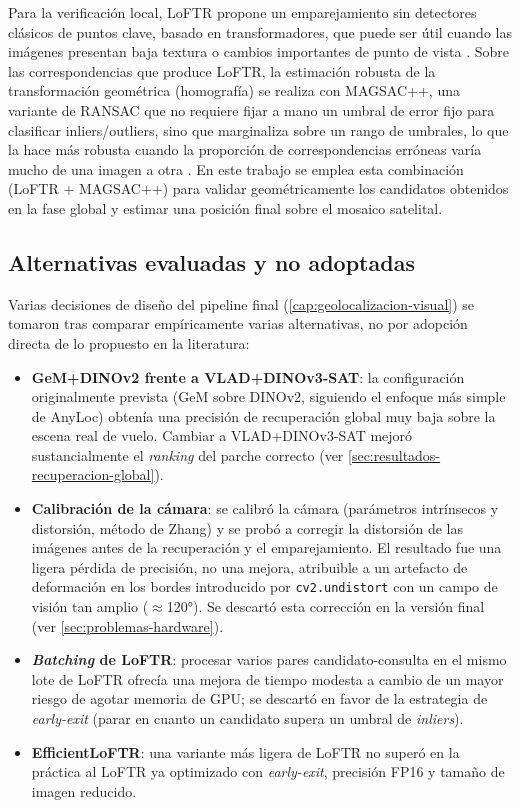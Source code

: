 Para la verificación local, LoFTR propone un emparejamiento sin detectores clásicos de puntos clave, basado en transformadores, que puede ser útil cuando las imágenes presentan baja textura o cambios importantes de punto de vista \parencite{sun2021loftr}. Sobre las correspondencias que produce LoFTR, la estimación robusta de la transformación geométrica (homografía) se realiza con MAGSAC++, una variante de RANSAC que no requiere fijar a mano un umbral de error fijo para clasificar inliers/outliers, sino que marginaliza sobre un rango de umbrales, lo que la hace más robusta cuando la proporción de correspondencias erróneas varía mucho de una imagen a otra \parencite{barath2020magsac++}. En este trabajo se emplea esta combinación (LoFTR + MAGSAC++) para validar geométricamente los candidatos obtenidos en la fase global y estimar una posición final sobre el mosaico satelital.

\subsection{Alternativas evaluadas y no adoptadas}
\label{sec:estado-alternativas-no-adoptadas}

Varias decisiones de diseño del pipeline final (\autoref{cap:geolocalizacion-visual}) se tomaron tras comparar empíricamente varias alternativas, no por adopción directa de lo propuesto en la literatura:

\begin{itemize}
\item \textbf{GeM+DINOv2 frente a VLAD+DINOv3-SAT}: la configuración originalmente prevista (GeM sobre DINOv2, siguiendo el enfoque más simple de AnyLoc) obtenía una precisión de recuperación global muy baja sobre la escena real de vuelo. Cambiar a VLAD+DINOv3-SAT mejoró sustancialmente el \textit{ranking} del parche correcto (ver \autoref{sec:resultados-recuperacion-global}).
\item \textbf{Calibración de la cámara}: se calibró la cámara (parámetros intrínsecos y distorsión, método de Zhang) y se probó a corregir la distorsión de las imágenes antes de la recuperación y el emparejamiento. El resultado fue una ligera pérdida de precisión, no una mejora, atribuible a un artefacto de deformación en los bordes introducido por \texttt{cv2.undistort} con un campo de visión tan amplio ($\approx$\ang{120}). Se descartó esta corrección en la versión final (ver \autoref{sec:problemas-hardware}).
\item \textbf{\textit{Batching} de LoFTR}: procesar varios pares candidato-consulta en el mismo lote de LoFTR ofrecía una mejora de tiempo modesta a cambio de un mayor riesgo de agotar memoria de GPU; se descartó en favor de la estrategia de \textit{early-exit} (parar en cuanto un candidato supera un umbral de \textit{inliers}).
\item \textbf{EfficientLoFTR}: una variante más ligera de LoFTR no superó en la práctica al LoFTR ya optimizado con \textit{early-exit}, precisión FP16 y tamaño de imagen reducido.
\end{itemize}

